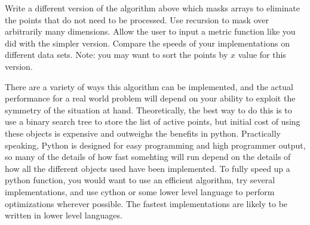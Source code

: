 \begin{problem}
Write a different version of the algorithm above which masks arrays to eliminate the points that do not need to be processed. 
Use recursion to mask over arbitrarily many dimensions. 
Allow the user to input a metric function like you did with the simpler version.
Compare the speeds of your implementations on different data sets.
Note: you may want to sort the points by $x$ value for this version.
\end{problem}

There are a variety of ways this algorithm can be implemented, and the actual performance for a real world problem will depend on your ability to exploit the symmetry of the situation at hand. 
Theoretically, the best way to do this is to use a binary search tree to store the list of active points, but initial cost of using these objects is expensive and outweighs the benefits in python.
Practically speaking, Python is designed for easy programming and high programmer output, so many of the details of how fast somehting will run depend on the details of how all the different objects used have been implemented.
To fully speed up a python function, you would want to use an efficient algorithm, try several implementations, and use cython or some lower level language to perform optimizations wherever possible. The fastest implementations are likely to be written in lower level languages.